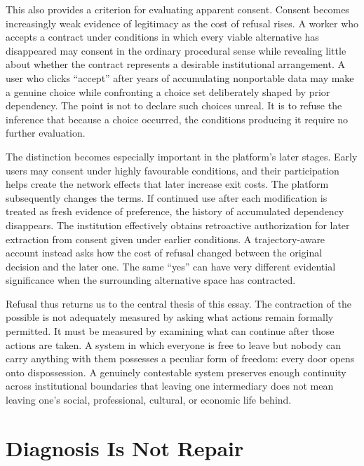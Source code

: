 \documentclass[11pt]{article}
\begin{document}
This also provides a criterion for evaluating apparent consent. Consent becomes increasingly weak evidence of legitimacy as the cost of refusal rises. A worker who accepts a contract under conditions in which every viable alternative has disappeared may consent in the ordinary procedural sense while revealing little about whether the contract represents a desirable institutional arrangement. A user who clicks ``accept'' after years of accumulating nonportable data may make a genuine choice while confronting a choice set deliberately shaped by prior dependency. The point is not to declare such choices unreal. It is to refuse the inference that because a choice occurred, the conditions producing it require no further evaluation.

The distinction becomes especially important in the platform's later stages. Early users may consent under highly favourable conditions, and their participation helps create the network effects that later increase exit costs. The platform subsequently changes the terms. If continued use after each modification is treated as fresh evidence of preference, the history of accumulated dependency disappears. The institution effectively obtains retroactive authorization for later extraction from consent given under earlier conditions. A trajectory-aware account instead asks how the cost of refusal changed between the original decision and the later one. The same ``yes'' can have very different evidential significance when the surrounding alternative space has contracted.

Refusal thus returns us to the central thesis of this essay. The contraction of the possible is not adequately measured by asking what actions remain formally permitted. It must be measured by examining what can continue after those actions are taken. A system in which everyone is free to leave but nobody can carry anything with them possesses a peculiar form of freedom: every door opens onto dispossession. A genuinely contestable system preserves enough continuity across institutional boundaries that leaving one intermediary does not mean leaving one's social, professional, cultural, or economic life behind.

\section{Diagnosis Is Not Repair}
\end{document}
